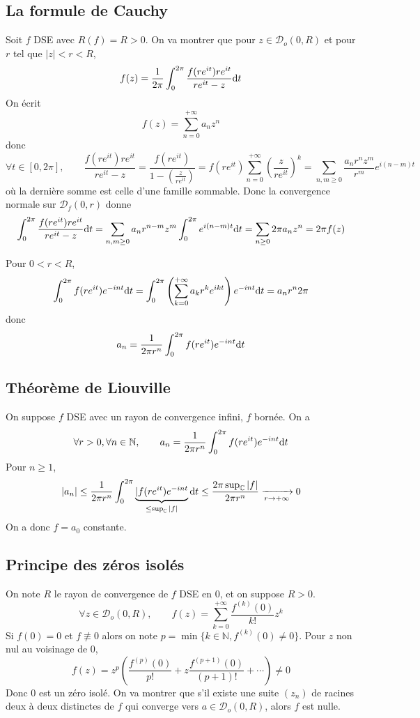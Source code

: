 \subsection{La formule de Cauchy}

Soit $f$ DSE avec $R(f)=R>0$. On va montrer que pour $z \in \mathcal{D}_o(0, R)$ et pour $r$ tel que $|z|<r<R$, \[
    f(z)=\frac{1}{2\pi}\int_{0}^{2\pi} \frac{f(re^{it})re^{it}}{re^{it}-z}\mathrm{d} t
\]
On écrit \[
    f(z)=\sum_{n=0}^{+\infty} a_n z^n
\]
donc\[
    \forall t\in [0, 2\pi],  \qquad \frac{f(re^{it})re^{it}}{re^{it}-z}=\frac{f(re^{it})}{1- \left( \frac{z}{re^{it}} \right) } = f(re^{it}) \sum_{n=0}^{+\infty} \left( \frac{z}{re^{it}} \right)^k=\sum_{n,m\geq 0} \frac{a_nr^nz^m}{r^m}e^{i(n-m)t}
\]
où la dernière somme est celle d'une famille sommable. Donc la convergence normale sur $\mathcal{D}_f(0,r)$ donne \[
    \int_{0}^{2\pi} \frac{f(re^{it})re^{it}}{re^{it}-z}\mathrm{d} t= \sum_{n,m\geq 0}a_nr^{n-m}z^m \int_{0}^{2\pi} e^{i(n-m)t}\mathrm{d} t=\sum_{n\geq 0}2\pi a_nz^n=2\pi f(z)
\]

\begin{rem}
    Pour $0<r<R$, \[
        \int_{0}^{2\pi } f(re^{it})e^{-i nt}\mathrm{d} t = \int_{0}^{2\pi } \left( \sum_{k=0}^{+\infty} a_kr^ke^{ikt} \right) e^{-int}\mathrm{d} t=a_nr^{n}2\pi 
    \]
    donc \[
        a_n=\frac{1}{2\pi r^n}\int_{0}^{2\pi } f(re^{it})e^{-int}\mathrm{d} t 
    \]
\end{rem}

\subsection{Théorème de Liouville}

On suppose $f$ DSE avec un rayon de convergence infini, $f$ bornée. On a \[
    \forall r>0, \forall n\in\mathbb N, \qquad a_n=\frac{1}{2\pi r^n}\int_{0}^{2\pi }f(re^{it}) e^{-int}\mathrm{d} t
\]
Pour $n\geq 1$, \[
    |a_n|\leq \frac{1}{2\pi r^n}\int_{0}^{2\pi } \underbrace{|f(re^{it})e^{-int}}_{\leq \sup_{\mathbb C}|f|}\mathrm{d} t\leq \frac{2\pi \sup_{\mathbb C}|f|}{2\pi r^n} \xrightarrow[r\to+\infty]{}0
\]
On a donc $f=a_0$ constante.


\subsection{Principe des zéros isolés}

On note $R$ le rayon de convergence de $f$ DSE en $0$, et on suppose $R>0$. \[
    \forall z \in \mathcal{D}_o(0,R),\qquad f(z)=\sum_{k=0}^{+\infty} \frac{f^{(k)}(0)}{k!}z^k
\]
Si $f(0)=0$ et $f\not\equiv 0$ alors on note $p=\min \{k\in\mathbb N, f^{(k)}(0)\neq 0\}$. Pour $z$ non nul au voisinage de $0$, \[
    f(z)=z^p \left( \frac{f^{(p)}(0)}{p!}+ z \frac{f^{(p+1)}(0)}{(p+1)!}+\cdots \right) \neq 0
\]
Donc $0$ est un zéro isolé. On va montrer que s'il existe une suite $(z_n)$ de racines deux à deux distinctes de $f$ qui converge vers $a\in\mathcal D_o(0,R)$, alors $f$ est nulle.

